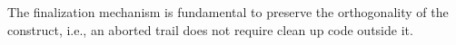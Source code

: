 The finalization mechanism is fundamental to preserve the orthogonality of the
 construct, i.e., an aborted trail does not require clean up code 
outside it.

